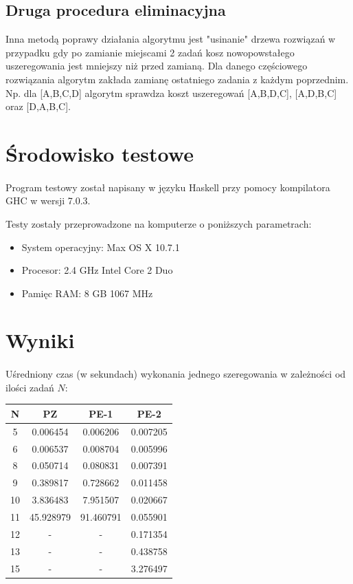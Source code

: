 \documentclass[wide,a4paper,titlepage,12pt] {article}
\begin{document}
  \subsection{Druga procedura eliminacyjna}
  Inna metodą poprawy działania algorytmu jest "usinanie" drzewa rozwiązań w przypadku
  gdy po zamianie miejscami 2 zadań kosz nowopowstałego uszeregowania jest mniejszy niż przed
  zamianą. Dla danego częściowego rozwiązania algorytm zakłada zamianę ostatniego zadania z każdym poprzednim.
  Np. dla [A,B,C,D] algorytm sprawdza koszt uszeregowań [A,B,D,C], [A,D,B,C] oraz [D,A,B,C].

  \section{Środowisko testowe}
  \paragraph{}
  Program testowy został napisany w języku Haskell przy pomocy kompilatora GHC w wersji 7.0.3.

  Testy zostały przeprowadzone na komputerze o poniższych parametrach:

  \begin{itemize}
    \item System operacyjny: Max OS X 10.7.1
    \item Procesor: 2.4 GHz Intel Core 2 Duo
    \item Pamięc RAM: 8 GB 1067 MHz
  \end{itemize}


  \section{Wyniki}
  \paragraph{}
  Uśredniony czas (w sekundach) wykonania jednego szeregowania w zależności od ilości zadań $N$:


  \begin{center}
    \begin{tabular}{|c|c|c|c|}
      \hline
      N  &         PZ &      PE-1 &      PE-2 \\
      \hline
       5 &   0.006454 &  0.006206 &  0.007205 \\
       6 &   0.006537 &  0.008704 &  0.005996 \\
       8 &   0.050714 &  0.080831 &  0.007391 \\
       9 &   0.389817 &  0.728662 &  0.011458 \\
      10 &   3.836483 &  7.951507 &  0.020667 \\
      11 &  45.928979 & 91.460791 &  0.055901 \\
      12 &  -         & -         &  0.171354 \\
      13 &  -         & -         &  0.438758 \\
      15 &  -         & -         &  3.276497 \\
      \hline
    \end{tabular}
  \end{center}
\end{document}
